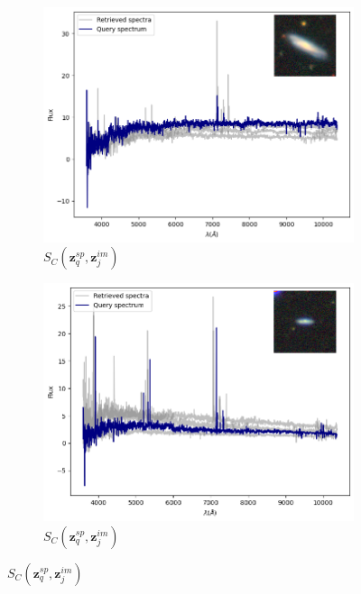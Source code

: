 \documentclass[a4paper,12pt]{article}
\begin{document}
\begin{figure}[H]
    \begin{subfigure}[b]{0.45\textwidth}
        \centering
        \includegraphics[width=\textwidth]{../figures/spectral_retrieval_im_sp_1}
        \caption{$S_C(\mathbf{z}_q^{sp}, \mathbf{z}_j^{im})$}
        \label{fig:im_sp_1}
    \end{subfigure}%
    \hfill
    \begin{subfigure}[b]{0.45\textwidth}
        \centering
        \includegraphics[width=\textwidth]{../figures/spectral_retrieval_im_sp_2}
        \caption{$S_C(\mathbf{z}_q^{sp}, \mathbf{z}_j^{im})$}
        \label{fig:im_sp_2}
    \end{subfigure}


\end{figure}
\end{document}
